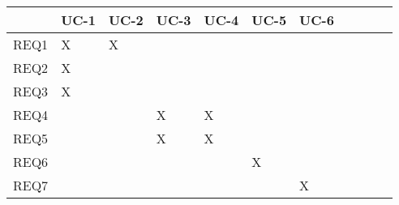 \documentclass[11pt,letterpaper]{article}
\begin{document}
\begin{center}
\begin{tabular}{|l|l|l|l|l|l|l|l|l|l|l|}
\hline
      & UC-1 & UC-2 & UC-3 & UC-4 & UC-5 & UC-6  \\ \hline
REQ1  & X    &   X   &    &      &      &            \\ \hline
REQ2  & X    &      &      &      &      &            \\ \hline
REQ3  & X    &      &      &      &      &            \\ \hline
REQ4  &      &     &    X  &  X    &      &             \\ \hline
REQ5  &      &     &   X   &  X   &      &             \\ \hline
REQ6  &      &      &      &      &  X   &          \\ \hline
REQ7  &      &      &      &      &     &  X        \\ \hline

\end{tabular}
\end{center}



\end{document}

